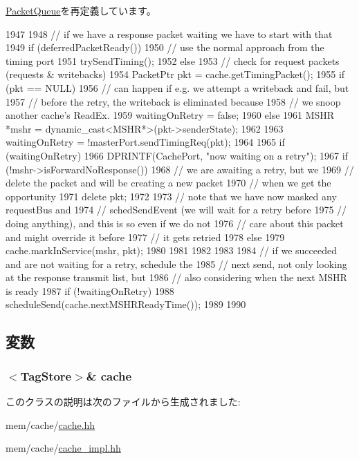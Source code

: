 \hyperlink{classPacketQueue_a3ce3f4b79c2caf000124b3de8ba9157c}{PacketQueue}を再定義しています。


\begin{DoxyCode}
1947 {
1948     // if we have a response packet waiting we have to start with that
1949     if (deferredPacketReady()) {
1950         // use the normal approach from the timing port
1951         trySendTiming();
1952     } else {
1953         // check for request packets (requests & writebacks)
1954         PacketPtr pkt = cache.getTimingPacket();
1955         if (pkt == NULL) {
1956             // can happen if e.g. we attempt a writeback and fail, but
1957             // before the retry, the writeback is eliminated because
1958             // we snoop another cache's ReadEx.
1959             waitingOnRetry = false;
1960         } else {
1961             MSHR *mshr = dynamic_cast<MSHR*>(pkt->senderState);
1962 
1963             waitingOnRetry = !masterPort.sendTimingReq(pkt);
1964 
1965             if (waitingOnRetry) {
1966                 DPRINTF(CachePort, "now waiting on a retry\n");
1967                 if (!mshr->isForwardNoResponse()) {
1968                     // we are awaiting a retry, but we
1969                     // delete the packet and will be creating a new packet
1970                     // when we get the opportunity
1971                     delete pkt;
1972                 }
1973                 // note that we have now masked any requestBus and
1974                 // schedSendEvent (we will wait for a retry before
1975                 // doing anything), and this is so even if we do not
1976                 // care about this packet and might override it before
1977                 // it gets retried
1978             } else {
1979                 cache.markInService(mshr, pkt);
1980             }
1981         }
1982     }
1983 
1984     // if we succeeded and are not waiting for a retry, schedule the
1985     // next send, not only looking at the response transmit list, but
1986     // also considering when the next MSHR is ready
1987     if (!waitingOnRetry) {
1988         scheduleSend(cache.nextMSHRReadyTime());
1989     }
1990 }
\end{DoxyCode}


\subsection{変数}
\hypertarget{classCache_1_1MemSidePacketQueue_adf2b34ffa42914b9356a0788fc109bcc}{
\subsubsection[{cache}]{$<$TagStore$>$\& {\bf cache}}}
\label{classCache_1_1MemSidePacketQueue_adf2b34ffa42914b9356a0788fc109bcc}


このクラスの説明は次のファイルから生成されました:\begin{DoxyCompactItemize}
\item 
mem/cache/\hyperlink{cache_8hh}{cache.hh}\item 
mem/cache/\hyperlink{cache__impl_8hh}{cache\_\-impl.hh}\end{DoxyCompactItemize}

